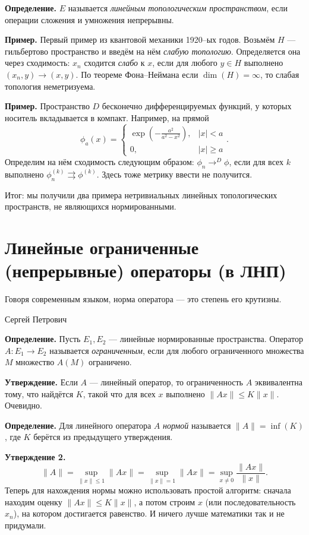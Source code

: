 \textbf{Определение.} $E$ называется \textit{линейным топологическим пространством}, если операции сложения и умножения непрерывны.

\textbf{Пример.} 
Первый пример из квантовой механики 1920--ых годов.
Возьмём $H$ --- гильбертово пространство и введём на нём \textit{слабую топологию}.
Определяется она через сходимость: $x_n$ сходится \textit{слабо} к $x$, если для любого $y \in H$ выполнено $(x_n, y) \to (x, y)$.
По теореме Фона--Неймана если $\dim(H) = \infty$, то слабая топология неметризуема.

\textbf{Пример.} Пространство $D$ бесконечно дифференцируемых функций, у которых носитель вкладывается в компакт.
Например, на прямой
\[
    \phi_a(x) =
    \begin{cases}
        \exp \left( - \frac{a^2}{a^2 - x^2} \right), & |x| < a \\
        0, & |x| \ge a
    \end{cases} .
\]
Определим на нём сходимость следующим образом: $\phi_n \to^D \phi$, если для всех $k$ выполнено $\phi_n^{(k)} \rightrightarrows \phi^{(k)}$.
Здесь тоже метрику ввести не получится.

Итог: мы получили два примера нетривиальных линейных топологических пространств, не являющихся нормированными.

\section{Линейные ограниченные (непрерывные) операторы (в ЛНП)}
\epigraph{Говоря современным языком, норма оператора --- это степень его крутизны.}{Сергей Петрович}

\textbf{Определение.} Пусть $E_1, E_2$ --- линейные нормированные пространства.
Оператор $A: E_1 \to E_2$ называется \textit{ограниченным}, если для любого ограниченного множества $M$ множество $A(M)$ ограничено.

\textbf{Утверждение.} Если $A$ --- линейный оператор, то ограниченность $A$ эквивалентна тому, что найдётся $K$, такой что для всех $x$ выполнено $\|Ax\| \le K \|x\|$.
Очевидно.

\textbf{Определение.} Для линейного оператора $A$ \textit{нормой} называется $\|A\| = \inf(K)$, где $K$ берётся из предыдущего утверждения.

\textbf{Утверждение 2.}
\[
    \|A\| = \sup_{\|x\| \le 1} \|Ax\| = \sup_{\|x\| = 1} \|Ax\| = \sup_{x \ne 0} \frac{\|Ax\|}{\|x\|}.
\]
Теперь для нахождения нормы можно использовать простой алгоритм: сначала находим оценку $\|Ax\| \le K\|x\|$, а потом строим $x$ (или последовательность $x_n$), на котором достигается равенство.
И ничего лучше математики так и не придумали.

